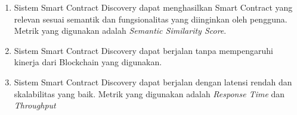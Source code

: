\begin{enumerate}
  \item Sistem Smart Contract Discovery dapat menghasilkan Smart Contract yang relevan sesuai semantik dan fungsionalitas yang diinginkan oleh pengguna. Metrik yang digunakan adalah \textit{Semantic Similarity Score}.
  \item Sistem Smart Contract Discovery dapat berjalan tanpa mempengaruhi kinerja dari Blockchain yang digunakan. 
  \item Sistem Smart Contract Discovery dapat berjalan dengan latensi rendah dan skalabilitas yang baik. Metrik yang digunakan adalah \textit{Response Time} dan \textit{Throughput}
\end{enumerate}